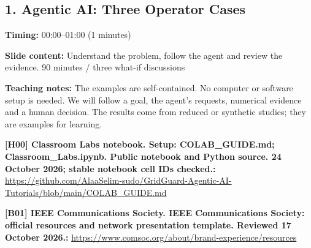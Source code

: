 \documentclass[10pt,letterpaper]{article}
\begin{document}
\subsection*{1. Agentic AI: Three Operator Cases}
\textbf{Timing:} 00:00--01:00 (1 minutes)\par
\textbf{Slide content:} Understand the problem, follow the agent and review the evidence.
90 minutes / three what-if discussions\par
\textbf{Teaching notes:} The examples are self-contained. No computer or software setup is needed. We will follow a goal, the agent's requests, numerical evidence and a human decision. The results come from reduced or synthetic studies; they are examples for learning.\par
\textbf{[H00] Classroom Labs notebook. Setup: COLAB\_GUIDE.md; Classroom\_Labs.ipynb. Public notebook and Python source. 24 October 2026; stable notebook cell IDs checked.:} \href{https://github.com/AlaaSelim-sudo/GridGuard-Agentic-AI-Tutorials/blob/main/COLAB_GUIDE.md}{\small\ttfamily https:/\allowbreak{}/\allowbreak{}github.\allowbreak{}com/\allowbreak{}AlaaSelim-\allowbreak{}sudo/\allowbreak{}GridGuard-\allowbreak{}Agentic-\allowbreak{}AI-\allowbreak{}Tutorials/\allowbreak{}blob/\allowbreak{}main/\allowbreak{}COLAB\_\allowbreak{}GUIDE.\allowbreak{}md}\par
\textbf{[B01] IEEE Communications Society. IEEE Communications Society: official resources and network presentation template. Reviewed 17 October 2026.:} \href{https://www.comsoc.org/about/brand-experience/resources}{\small\ttfamily https:/\allowbreak{}/\allowbreak{}www.\allowbreak{}comsoc.\allowbreak{}org/\allowbreak{}about/\allowbreak{}brand-\allowbreak{}experience/\allowbreak{}resources}\par
\par\medskip
\end{document}

